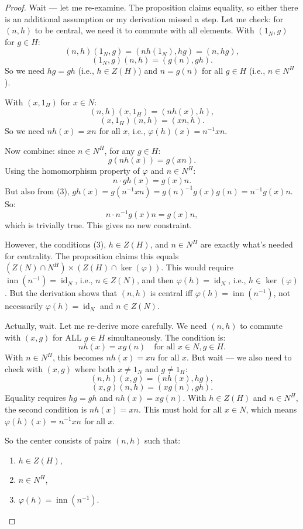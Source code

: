 \begin{proof}
    Wait — let me re-examine. The proposition claims equality, so either there is an additional assumption or my derivation missed a step. Let me check: for $(n,h)$ to be central, we need it to commute with all elements. With $(1_N, g)$ for $g \in H$:
    $$ (n,h)(1_N,g) = (nh(1_N), hg) = (n, hg),$$
    $$(1_N,g)(n,h) = (g(n), gh).$$
    So we need $hg = gh$ (i.e., $h \in Z(H)$) and $n = g(n)$ for all $g \in H$ (i.e., $n \in N^H$).

    With $(x, 1_H)$ for $x \in N$:
    $$ (n,h)(x,1_H) = (nh(x), h),$$
    $$(x,1_H)(n,h) = (xn, h).$$
    So we need $nh(x) = xn$ for all $x$, i.e., $\varphi(h)(x) = n^{-1}xn$.

    Now combine: since $n \in N^H$, for any $g \in H$:
    $$ g(nh(x)) = g(xn).$$
    Using the homomorphism property of $\varphi$ and $n \in N^H$:
    $$ n \cdot gh(x) = g(x)n.$$
    But also from (3), $gh(x) = g(n^{-1}xn) = g(n)^{-1}g(x)g(n) = n^{-1}g(x)n$. So:
    $$n \cdot n^{-1}g(x)n = g(x)n,$$
    which is trivially true. This gives no new constraint.

    However, the conditions (3), $h \in Z(H)$, and $n \in N^H$ are exactly what's needed for centrality. The proposition claims this equals $(Z(N) \cap N^H) \times (Z(H) \cap \ker(\varphi))$. This would require $\operatorname{inn}(n^{-1}) = \operatorname{id}_N$, i.e., $n \in Z(N)$, and then $\varphi(h) = \operatorname{id}_N$, i.e., $h \in \ker(\varphi)$. But the derivation shows that $(n,h)$ is central iff $\varphi(h) = \operatorname{inn}(n^{-1})$, not necessarily $\varphi(h) = \operatorname{id}_N$ and $n \in Z(N)$.

    Actually, wait. Let me re-derive more carefully. We need $(n,h)$ to commute with $(x,g)$ for ALL $g \in H$ simultaneously. The condition is:
    $$n h(x) = x g(n) \quad \text{for all } x \in N, g \in H.$$
    With $n \in N^H$, this becomes $nh(x) = xn$ for all $x$. But wait — we also need to check with $(x,g)$ where both $x \neq 1_N$ and $g \neq 1_H$:
    $$ (n,h)(x,g) = (nh(x), hg),$$
    $$(x,g)(n,h) = (xg(n), gh).$$
    Equality requires $hg = gh$ and $nh(x) = xg(n)$. With $h \in Z(H)$ and $n \in N^H$, the second condition is $nh(x) = xn$. This must hold for all $x \in N$, which means $\varphi(h)(x) = n^{-1}xn$ for all $x$.

    So the center consists of pairs $(n,h)$ such that:
    \begin{enumerate}
        \item $h \in Z(H)$,
        \item $n \in N^H$,
        \item $\varphi(h) = \operatorname{inn}(n^{-1})$.
    \end{enumerate}


\end{proof}
